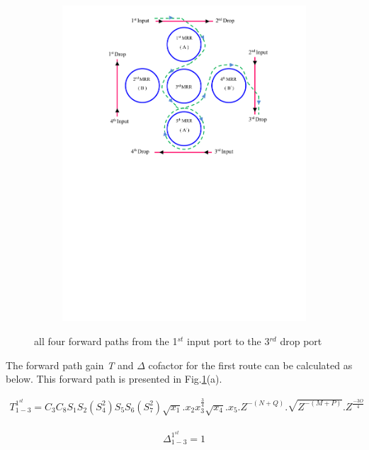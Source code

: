 \documentclass{osa-article}
\begin{document}
\begin{figure}[h!]
\begin{subfigure}[b]{0.4\linewidth}
    \includegraphics[width=\linewidth]{figs/fig4a_ID134.pdf}
    \caption{}
  \end{subfigure}
  \caption{all four forward paths from the 1$^{st}$ input port to the 3$^{rd}$ drop port}
  \label{fig4a}
\end{figure}
The forward path gain \textit {T} and $\Delta$ cofactor for the first route can be calculated as below. This forward path is presented in Fig.\ref{fig4a}(a).

\begin{equation}
\begin{split}
T^{1^{st}}_{1-3}=C_3C_8S_1S_2(S^2_4)S_5S_6(S^2_7)\sqrt{x_1}.x_{2}{x^{\frac{3}{4}}_3}\sqrt{x_4}.x_{5}.Z^{-(N+Q)}.\sqrt{Z^{-(M+P)}}.Z^{\frac{-3O}{4}}
\end{split}
\end{equation}

\begin{equation}
\begin{split}
\Delta^{1^{st}}_{1-3}=1
\end{split}
\end{equation}
\end{document}

